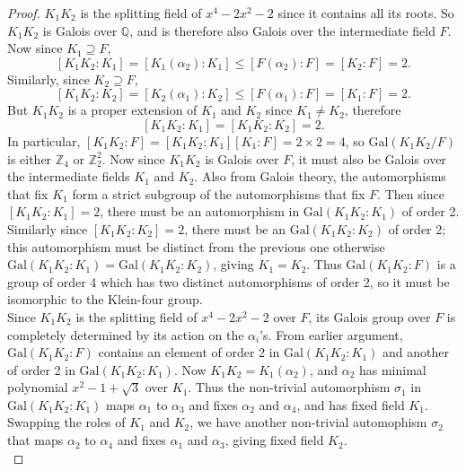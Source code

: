 \documentclass{article}
\begin{document}
\begin{enumerate}[label={(\alph*)}]
      \begin{proof}
        $K_1K_2$ is the splitting field of $x^4-2x^2-2$ since it contains
        all its roots. So $K_1K_2$ is Galois over $\mathbb{Q}$, and is
        therefore also Galois over the intermediate field $F$.
        Now since $K_1\supseteq F$,
        \[[K_1K_2:K_1] =[K_1(\alpha_2):K_1] \leq[F(\alpha_2):F]
        =[K_2:F]=2.\]
        Similarly, since $K_2\supseteq F$,
        \[[K_1K_2:K_2] =[K_2(\alpha_1):K_2] \leq[F(\alpha_1):F]
        =[K_1:F]=2.\]
        But $K_1K_2$ is a proper extension of $K_1$ and $K_2$ since
        $K_1\neq K_2$, therefore
        \[[K_1K_2:K_1] =[K_1K_2:K_2] =2.\]
        In particular, $[K_1K_2:F]=[K_1K_2:K_1][K_1:F]=2\times2=4$, so
        $\text{Gal}(K_1K_2/F)$ is either $\mathbb{Z}_4$ or
        $\mathbb{Z}_2^2$. Now since $K_1K_2$ is Galois over $F$, it must
        also be Galois over the intermediate fields $K_1$ and $K_2$. Also
        from Galois theory, the automorphisms that fix $K_1$ form a strict
        subgroup of the automorphisms that fix $F$. Then
        since $[K_1K_2:K_1]=2$, there must be an automorphism in
        $\text{Gal}(K_1K_2:K_1)$ of order 2. Similarly since
        $[K_1K_2:K_2]=2$, there must be an $\text{Gal}(K_1K_2:K_2)$ of
        order 2; this automorphism must be distinct from the previous one
        otherwise $\text{Gal}(K_1K_2:K_1) =\text{Gal}(K_1K_2:K_2)$, giving
        $K_1=K_2$. Thus $\text{Gal}(K_1K_2:F)$ is a group of order 4 which
        has two distinct automorphisms of order 2, so it must be isomorphic
        to the Klein-four group. \\

        Since $K_1K_2$ is the splitting field of $x^4-2x^2-2$ over $F$, its
        Galois group over $F$ is completely determined by its action on the
        $\alpha_i$'s. From earlier argument, $\text{Gal}(K_1K_2:F)$
        contains an element of order 2 in $\text{Gal}(K_1K_2:K_1)$ and
        another of order 2 in $\text{Gal}(K_1K_2:K_1)$. Now
        $K_1K_2=K_1(\alpha_2)$, and $\alpha_2$ has minimal polynomial
        $x^2-1+\sqrt{3}$ over $K_1$. Thus the non-trivial automorphism
        $\sigma_1$ in $\text{Gal}(K_1K_2:K_1)$ maps $\alpha_1$ to
        $\alpha_3$ and fixes $\alpha_2$ and $\alpha_4$, and has fixed field
        $K_1$. \\

        Swapping the roles of $K_1$ and $K_2$,
        we have another non-trivial automophism $\sigma_2$ that maps
        $\alpha_2$ to $\alpha_4$ and fixes $\alpha_1$ and $\alpha_3$,
        giving fixed field $K_2$. \\


\end{proof}
\end{enumerate}
\end{document}
